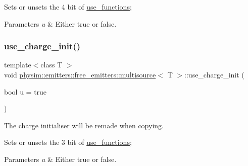 Sets or unsets the 4 bit of \hyperlink{classphysim_1_1emitters_1_1free__emitters_1_1multisource_a99bad5ac0fb5cb14652bbfd0c1f0eeff}{use\+\_\+functions}; 
\begin{DoxyParams}{Parameters}
{\em u} & Either true or false. \\
\hline
\end{DoxyParams}
\mbox{\label{classphysim_1_1emitters_1_1free__emitters_1_1multisource_a9def4fac2754546b0130fce7557785b3}} 
\subsubsection{\texorpdfstring{use\+\_\+charge\+\_\+init()}{use\_charge\_init()}}
{\footnotesize\ttfamily template$<$class T $>$ \\
void \hyperlink{classphysim_1_1emitters_1_1free__emitters_1_1multisource}{physim\+::emitters\+::free\+\_\+emitters\+::multisource}$<$ T $>$\+::use\+\_\+charge\+\_\+init (\begin{DoxyParamCaption}\item[{bool}]{u = {\ttfamily true} }\end{DoxyParamCaption})}



The charge initialiser will be remade when copying. 

Sets or unsets the 3 bit of \hyperlink{classphysim_1_1emitters_1_1free__emitters_1_1multisource_a99bad5ac0fb5cb14652bbfd0c1f0eeff}{use\+\_\+functions}; 
\begin{DoxyParams}{Parameters}
{\em u} & Either true or false. \\
\hline
\end{DoxyParams}
\mbox{\label{classphysim_1_1emitters_1_1free__emitters_1_1multisource_a115436d1054f17688925a6157399f7a9}} 
